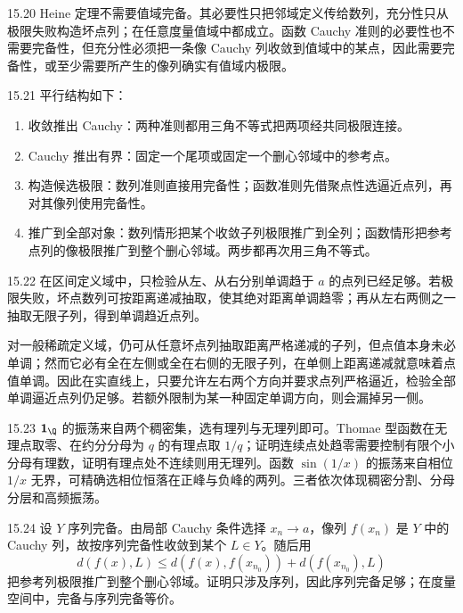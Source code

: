\begin{solution}{15.20}
Heine 定理不需要值域完备。其必要性只把邻域定义传给数列，充分性只从极限失败构造坏点列；在任意度量值域中都成立。函数 Cauchy 准则的必要性也不需要完备性，但充分性必须把一条像 Cauchy 列收敛到值域中的某点，因此需要完备性，或至少需要所产生的像列确实有值域内极限。
\end{solution}

\begin{solution}{15.21}
平行结构如下：
\begin{enumerate}
 \item 收敛推出 Cauchy：两种准则都用三角不等式把两项经共同极限连接。
 \item Cauchy 推出有界：固定一个尾项或固定一个删心邻域中的参考点。
 \item 构造候选极限：数列准则直接用完备性；函数准则先借聚点性选逼近点列，再对其像列使用完备性。
 \item 推广到全部对象：数列情形把某个收敛子列极限推广到全列；函数情形把参考点列的像极限推广到整个删心邻域。两步都再次用三角不等式。
\end{enumerate}
\end{solution}

\begin{solution}{15.22}
在区间定义域中，只检验从左、从右分别单调趋于 \(a\) 的点列已经足够。若极限失败，坏点数列可按距离递减抽取，使其绝对距离单调趋零；再从左右两侧之一抽取无限子列，得到单调趋近点列。

对一般稀疏定义域，仍可从任意坏点列抽取距离严格递减的子列，但点值本身未必单调；然而它必有全在左侧或全在右侧的无限子列，在单侧上距离递减就意味着点值单调。因此在实直线上，只要允许左右两个方向并要求点列严格逼近，检验全部单调逼近点列仍足够。若额外限制为某一种固定单调方向，则会漏掉另一侧。
\end{solution}

\begin{solution}{15.23}
\(\mathbf1_{\Q}\) 的振荡来自两个稠密集，选有理列与无理列即可。Thomae 型函数在无理点取零、在约分分母为 \(q\) 的有理点取 \(1/q\)；证明连续点处趋零需要控制有限个小分母有理数，证明有理点处不连续则用无理列。函数 \(\sin(1/x)\) 的振荡来自相位 \(1/x\) 无界，可精确选相位恒落在正峰与负峰的两列。三者依次体现稠密分割、分母分层和高频振荡。
\end{solution}

\begin{solution}{15.24}
设 \(Y\) 序列完备。由局部 Cauchy 条件选择 \(x_n\to a\)，像列 \(f(x_n)\) 是 \(Y\) 中的 Cauchy 列，故按序列完备性收敛到某个 \(L\in Y\)。随后用
\[
 d(f(x),L)\le d(f(x),f(x_{n_0}))+d(f(x_{n_0}),L)
\]
把参考列极限推广到整个删心邻域。证明只涉及序列，因此序列完备足够；在度量空间中，完备与序列完备等价。
\end{solution}
